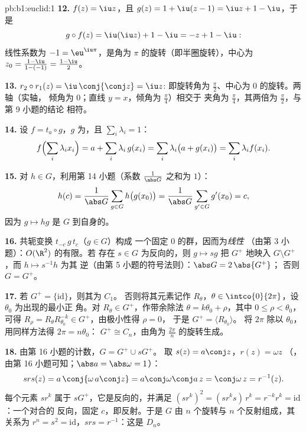 \begin{solution}{pb:b1:euclid:1}
\textbf{12.} $f(z) = \iu z$，且 $g(z) = 1 + \iu(z - 1) = \iu z
+ 1 - \iu$，于是
\[
g\circ f(z) = \iu(\iu z) + 1 - \iu = -z + 1 - \iu :
\]
线性系数为 $-1 = \eu^{\iu\pi}$，是角为
$\pi$ 的旋转（即半圈旋转），中心为 $z_0 = \frac{1 - \iu}{1 - (-1)}
= \frac{1 - \iu}{2}$。

\textbf{13.} $r_2\circ r_1(z) = \iu\,\conj{\conj z} = \iu z$:
即旋转角为 $\frac\pi2$、中心为 $0$ 的旋转。两轴（实轴，
倾角为 $0$；直线 $y = x$，倾角为 $\frac\pi4$）相交于
夹角为 $\frac\pi4$，其两倍为 $\frac\pi2$，与第 9 小题的结论
相符。

\textbf{14.} 设 $f = t_a\circ g$，$g$ 为，且 $\sum_i
\lambda_i = 1$：
\[
f\Bigl(\sum_i \lambda_i x_i\Bigr)
= a + \sum_i \lambda_i\,g(x_i)
= \sum_i \lambda_i\bigl(a + g(x_i)\bigr)
= \sum_i \lambda_i f(x_i) .
\]

\textbf{15.} 对 $h \in G$，利用第 14 小题（系数
$\frac1{\abs G}$ 之和为 $1$）：
\[
h(c) = \frac{1}{\abs G}\sum_{g \in G} h\bigl(g(x_0)\bigr)
= \frac{1}{\abs G}\sum_{g' \in G} g'(x_0) = c ,
\]
因为 $g \mapsto hg$ 是 $G$ 到自身的。

\textbf{16.} 共轭变换 $t_{-c}\,g\,t_{c}$（$g \in G$）构成
一个固定 $0$ 的群，因而为\emph{线性}
（由第 3 小题）：$O(\R^2)$ 的有限。若
存在 $s \in G$ 为反向的，则 $g \mapsto sg$ 把 $G^+$
地映入 $G\setminus G^+$，而 $h \mapsto s^{-1}h$ 为其
逆（由第 5 小题的符号法则）：$\abs G = 2\,\abs{G^+}$；
否则 $G = G^+$。

\textbf{17.} 若 $G^{+} = \{\mathrm{id}\}$，则其为 $C_1$。
否则将其元素记作 $R_\theta$，$\theta \in
\intco{0}{2\pi}$，设 $\theta_0$ 为出现的最小正
角。对 $R_\theta \in G^{+}$，作带余除法
$\theta = k\theta_0 + \rho$，其中 $0 \leq \rho < \theta_0$，可得
$R_\rho = R_\theta R_{\theta_0}^{-k} \in G^{+}$，由极小性得 $\rho = 0$，
于是 $G^{+} = \langle R_{\theta_0}\rangle$。
将 $2\pi$ 除以 $\theta_0$，用同样方法得 $2\pi = n\theta_0$：
$G^{+} \cong C_n$，由角为
$\frac{2\pi}n$ 的旋转生成。

\textbf{18.} 由第 16 小题的计数，$G = G^{+} \cup sG^{+}$。
取 $s(z) = a\conj z$，$r(z) = \omega z$
（，由第 16 小题可知；$\abs a = \abs\omega = 1$）：
\[
s r s(z) = a\,\conj{\omega\,a\conj z}
= a\conj\omega\conj a\,z = \conj\omega\,z = r^{-1}(z) .
\]
每个元素 $sr^k$ 属于 $sG^{+}$，它是反向的，并满足
$(sr^k)^2 = (sr^ks)\,r^k = r^{-k}r^k = \mathrm{id}$：一个对合的
反向，固定 $c$，即反射。于是
$G$ 由 $n$ 个旋转与 $n$ 个反射组成，其关系为
$r^n = s^2 = \mathrm{id}$，$srs = r^{-1}$：这是
 $D_n$。


\end{solution}
